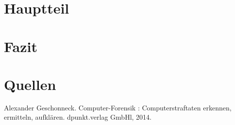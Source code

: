 \documentclass[12pt,DIV=14, version=first, BCOR=10mm,a4paper,twoside,parskip=half-,headsepline,headinclude]{scrartcl}
\begin{document}
	
	 
	    
	
	
	
	
	
	\section{Hauptteil}
	
	
	
	
	
	\section{Fazit}
	
	
	
	
	\section{Quellen}


\pagebreak

%




%
\begin{thebibliography}{9}
	Alexander Geschonneck. Computer-Forensik : Computerstraftaten erkennen, ermitteln, aufklären. dpunkt.verlag GmbHl, 2014.
	
	
	
\end{thebibliography}
\end{document}
